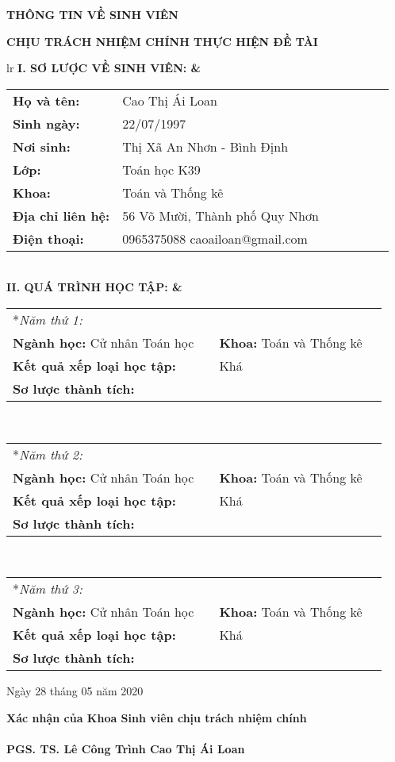 \thispagestyle{empty}
\centerline{\bf  THÔNG TIN VỀ SINH VIÊN}
\centerline{\bf  CHỊU TRÁCH NHIỆM CHÍNH THỰC HIỆN ĐỀ TÀI}
\vskip15mm
\begin{tabular}{lr}
\bf I. SƠ LƯỢC VỀ SINH VIÊN: &   \\
\begin{tabular}{lllllll}
\bf Họ và tên: & Cao Thị Ái Loan \qquad\quad\qquad\qquad\qquad\qquad\fbox{Ảnh $4\times 6$}\\
\bf Sinh ngày: & 22/07/1997   & & &\\
\bf Nơi sinh: & Thị Xã An Nhơn - Bình Định \\
\bf Lớp: & Toán học K39  \quad {\bf Khóa:}\quad 39 \\
\bf Khoa: & Toán và Thống kê \\
\bf Địa chỉ liên hệ: & 56 Võ Mười, Thành phố Quy Nhơn\\
\bf Điện thoại: & 0965375088 \qquad\qquad\quad {\bf Email:} caoailoan@gmail.com
\end{tabular}
\\
\bf II. QUÁ TRÌNH HỌC TẬP: & \\
\begin{tabular}{llll}
*\it Năm thứ 1: & \\
{\bf Ngành học:}  Cử nhân Toán học  & & {\bf Khoa:}  Toán và Thống kê  \\
\bf Kết quả xếp loại học tập: & & Khá \\
\bf Sơ lược thành tích: & 
\end{tabular}
\\
\begin{tabular}{llll}
*\it Năm thứ 2: & \\
{\bf Ngành học:}  Cử nhân Toán học & & {\bf Khoa:}  Toán và Thống kê \\
\bf Kết quả xếp loại học tập: & & Khá\\
\bf Sơ lược thành tích: & 
\end{tabular}
\\
\begin{tabular}{llll}
	*\it Năm thứ 3: & \\
	{\bf Ngành học:}  Cử nhân Toán học  & & {\bf Khoa:}  Toán và Thống kê  \\
	\bf Kết quả xếp loại học tập: & & Khá\\
	\bf Sơ lược thành tích: & 
\end{tabular}
\end{tabular}

\hfill Ngày 28 tháng 05 năm 2020 \mbox{\qquad }

\hfill{\bf Xác nhận của Khoa \hskip3cm  Sinh viên chịu trách nhiệm chính} \mbox{\quad}
\\
\\

\hfill{\bf PGS. TS. Lê Công Trình \hskip3.5cm Cao Thị Ái Loan}\mbox{\qquad\quad\quad}
\vskip15mm